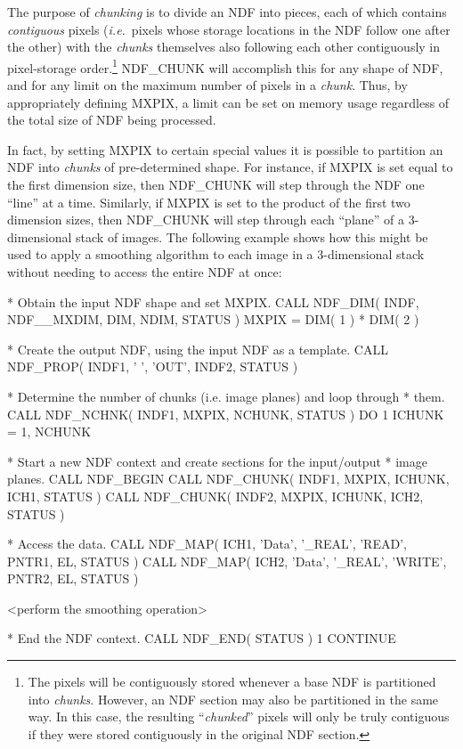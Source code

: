 \documentclass[twoside,11pt,nolof]{starlink}
\providecommand{\st}[1]{{\emph{#1}}}
\begin{document}
The purpose of \st{chunking\/} is to divide an NDF into pieces, each of which
contains \st{contiguous\/} pixels (\st{i.e.}\ pixels whose storage locations
in the NDF follow one after the other) with the \st{chunks\/} themselves also
following each other contiguously in pixel-storage order.\footnote{The pixels
will be contiguously stored whenever a base NDF is partitioned into \st{chunks}. However, an NDF section may also be partitioned in the same way. In
this case, the resulting ``\st{chunked\/}'' pixels will only be truly
contiguous if they were stored contiguously in the original NDF section.}
NDF\_CHUNK will accomplish this for any shape of NDF, and for any limit on the
maximum number of pixels in a \st{chunk}. Thus, by appropriately defining
MXPIX, a limit can be set on memory usage regardless of the total size of NDF
being processed.

In fact, by setting MXPIX to certain special values it is possible to partition
an NDF into \st{chunks\/} of pre-determined shape. For instance, if MXPIX is
set equal to the first dimension size, then NDF\_CHUNK will step through the NDF
one ``line'' at a time. Similarly, if MXPIX is set to the product of the first
two dimension sizes, then NDF\_CHUNK will step through each ``plane'' of a
3-dimensional stack of images. The following example shows how this might be
used to apply a smoothing algorithm to each image in a 3-dimensional stack
without needing to access the entire NDF at once:

\small
\begin{terminalv}
*  Obtain the input NDF shape and set MXPIX.
      CALL NDF_DIM( INDF, NDF__MXDIM, DIM, NDIM, STATUS )
      MXPIX = DIM( 1 ) * DIM( 2 )

*  Create the output NDF, using the input NDF as a template.
      CALL NDF_PROP( INDF1, ' ', 'OUT', INDF2, STATUS )

*  Determine the number of chunks (i.e. image planes) and loop through
*  them.
      CALL NDF_NCHNK( INDF1, MXPIX, NCHUNK, STATUS )
      DO 1 ICHUNK = 1, NCHUNK

*  Start a new NDF context and create sections for the input/output
*  image planes.
         CALL NDF_BEGIN
         CALL NDF_CHUNK( INDF1, MXPIX, ICHUNK, ICH1, STATUS )
         CALL NDF_CHUNK( INDF2, MXPIX, ICHUNK, ICH2, STATUS )

*  Access the data.
         CALL NDF_MAP( ICH1, 'Data', '_REAL', 'READ', PNTR1, EL, STATUS )
         CALL NDF_MAP( ICH2, 'Data', '_REAL', 'WRITE', PNTR2, EL, STATUS )

         <perform the smoothing operation>

*  End the NDF context.
         CALL NDF_END( STATUS )
 1    CONTINUE
\end{terminalv}
\normalsize
\end{document}
